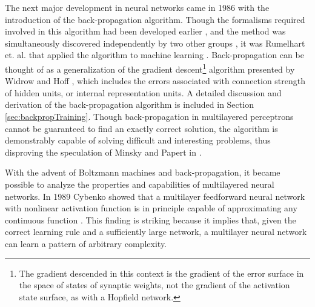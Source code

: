 \documentclass[11pt]{afthesis}
\begin{document}
	The next major development in neural networks came in 1986 with the introduction of the back-propagation algorithm. Though the formalisms required involved in this algorithm had been developed earlier \cite{bryson1969optimalcontrol, werbos1974beyondregression}, and the method was simultaneously discovered independently by two other groups \cite{parker1985logic, lecun1985}, it was Rumelhart et. al. that applied the algorithm to machine learning \cite{rumelhart1986internal}. Back-propagation can be thought of as a generalization of the gradient descent\footnote{The gradient descended in this context is the gradient of the error surface in the space of states of synaptic weights, not the gradient of the activation state surface, as with a Hopfield network.} algorithm presented by Widrow and Hoff \cite{widrow1960asc}, which includes the errors associated with connection strength of hidden units, or internal representation units. A detailed discussion and derivation of the back-propagation algorithm is included in Section \ref{sec:backpropTraining}. Though back-propagation in multilayered perceptrons cannot be guaranteed to find an exactly correct solution, the algorithm is demonstrably capable of solving difficult and interesting problems, thus disproving the speculation of Minsky and Papert in \cite{minsky1969perceptrons}.
	
	
	With the advent of Boltzmann machines and back-propagation, it became possible to analyze the properties and capabilities of multilayered neural networks. In 1989 Cybenko showed that a multilayer feedforward neural network with nonlinear activation function is in principle capable of approximating any continuous function  \cite{cybenko1989approxsuperposition}. This finding is striking because it implies that, given the correct learning rule and a sufficiently large network, a multilayer neural network can learn a pattern of arbitrary complexity. 
	
	
	
	
\end{document}
